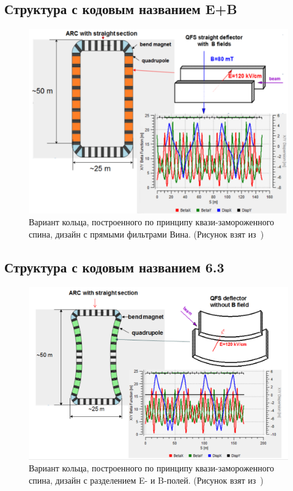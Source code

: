 \subsection{Структура с кодовым названием E+B}\label{sec:QFS_EB_lattice}

\begin{figure}[h!]
	\centering
	\includegraphics[width=\linewidth]{images/chapter2/E+B_lattice}
	\caption{Вариант кольца, построенного по принципу квази-замороженного спина, дизайн с прямыми фильтрами Вина. (Рисунок взят из~\cite{Senichev:Lattices})\label{fig:QFS_E+B_lattice}}
\end{figure}

\subsection{Структура с кодовым названием 6.3}\label{sec:QFS_6_3_lattice}

\begin{figure}[h!]
	\centering
	\includegraphics[width=\linewidth]{images/chapter2/6_3_lattice}
	\caption{Вариант кольца, построенного по принципу квази-замороженного спина, дизайн с разделением E- и B-полей. (Рисунок взят из~\cite{Senichev:Lattices})\label{fig:QFS_6_3_lattice}}
\end{figure}